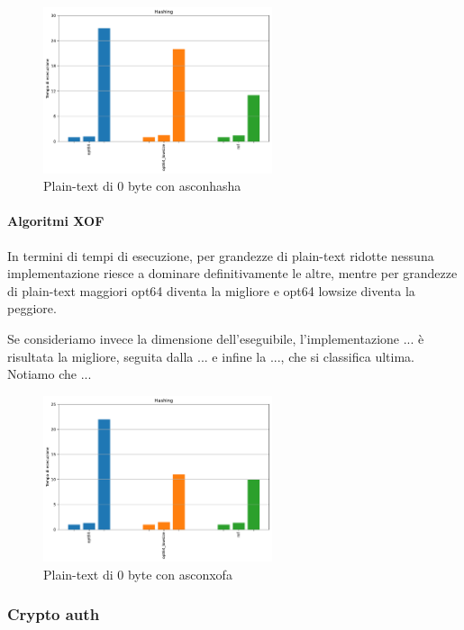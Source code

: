 \documentclass[12pt,a4paper,italian]{report}
\begin{document}
\begin{figure}[H]
    \centering
    \includegraphics[width=0.6\textwidth]{raspberry/asconhasha.pdf}
    \caption{Plain-text di 0 byte con asconhasha}
\end{figure}

\paragraph{Algoritmi XOF}

In termini di tempi di esecuzione, per grandezze di plain-text ridotte nessuna implementazione riesce a dominare definitivamente le altre, mentre per grandezze di plain-text maggiori opt64 diventa la migliore e opt64 lowsize diventa la peggiore.

\noindent Se consideriamo invece la dimensione dell'eseguibile, l'implementazione ...  è risultata la migliore, seguita dalla ... e infine la ..., che si classifica ultima. Notiamo che ...

\begin{figure}[H]
    \centering
    \includegraphics[width=0.6\textwidth]{raspberry/asconxofa.pdf}
    \caption{Plain-text di 0 byte con asconxofa}
\end{figure}

\subsubsection{Crypto auth}
\end{document}
